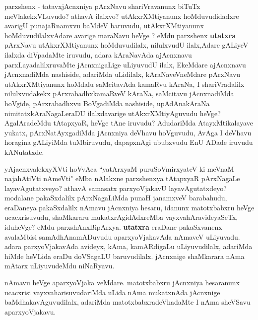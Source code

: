 \centerline{}

\begin{artha}
parxshenx - tatavxjAcnxniya pArxNavu shariVravanunx biTuTx meVlakekxVLuvudo? athavA ilalxvo? utAkxrXMtiyanunx hoMduvudidadxre avarigU punajaRnamxvu baMdeV baruvudu, utAkxrXMtiyanunx hoMduvudilalxvAdare avarige maraNavu heVge	? eMdu parxshenx \ndash 
\textbf{utatxra \ndash } pArxNavu utAkxrXMtiyanunx hoMduvudilalx, nilulxvudU ilalx,Adare gALiyeV ilalxda diVpadaMte iruvudu, adara kAraNavAda ajAcnxnavu parxLayadalilxruvaMte jAcnxnigaLige uLiyuvudU ilalx, EkeMdare ajAcnxnavu jAcnxnadiMda nashiside, adariMda uLidilalx, kAraNaveVneMdare pArxNavu utAkxrXMtiyanunx hoMdalu saMcitavAda kamaRvu kAraNa, I shariVradalilx nilulxvudakekx pArxrabadhxkamaRveV kAraNa, saMcitavu jAcnxnadiMda hoVgide, pArxrabadhxvu BoVgadiMda nashiside, upAdAnakAraNa nimitatxkAraNagaLeraDU ilalxdavarige utAkxrXMtiyAguvudu heVge? AgalAradeMdu tAtapxyaR, heVge tAne iruvudu? AdudariMda AtayxMtikalayave yukatx, pArxNatAyxgadiMda jAcnxniya deVhavu hoVguvudu, AvAga I deVhavu horagina gALiyiMda tuMbiruvudu, dapapxnAgi ububxvudu EnU ADade iruvudu kANutatxde.
\end{artha}

\begin{artha}
yAjacnxvalekxyXVti hoVvAca ``yatArxyaM puruSoVmirxyateV ki meVnaM  naja{\null}hAtiVti nAmeVti" eMba nAlakxne parxshenxya tAtapxyaR pArxNagaLe layavAgutatxveyo? athavA samasatx parxyoVjakavU layavAgutatxdeyo? modalane pakaSxdalilx pArxNagaLiMda punaH janamxveV barabahudu, eraDaneya pakaSxdalilx nAmavu jAcnxniya hesaru, idanunx matotxbabxru heVge ucacxrisuvudu, shaMkararu mukatxrAgidAdxreMba vayxvahAravideyaSeTx, iduheVge? eMdu parxshAnxBipArxya. \textbf{utatxra} \ndash  eraDane pakaSxvanenx avalaMbisi samAdhAnamADuvudu aparxyoVjakavAda nAmaveV uLiyuvadu. adara parxyoVjakavAda avideyx, kAma, kamARdigaLu uLiyuvudilalx, adariMda hiMde heVLida eraDu doVSagaLU baruvudilalx. jAcnxnige shaMkarara nAma mAtarx  uLiyuvudeMdu niNaRyavu.

nAmavu heVge aparxyoVjaka veMdare. matotxbabxru jAcnxniya hesaranunx ucacxrisi vayxvaharisuvudariMda uLida nAma mukatxnAda jAcnxnige baMdhakavAguvudilalx, adariMda matotxbabxradeVhadaMte I nAma sheVSavu aparxyoVjakavu.
\end{artha}

\centerline{}

